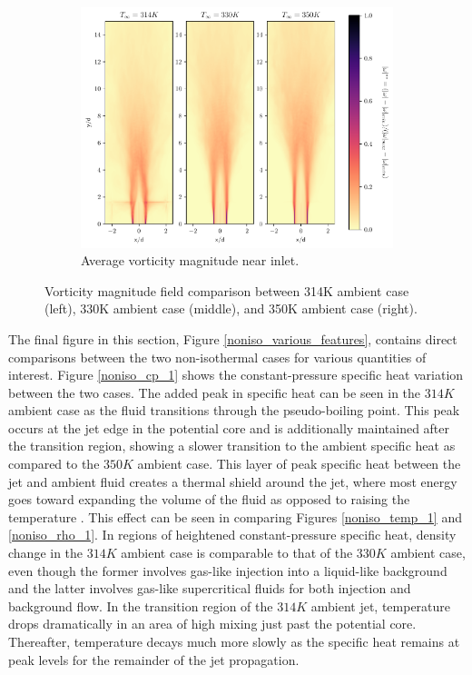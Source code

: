\begin{figure}[H]
\vfill
\centering
\begin{subfigure}{0.5\textwidth}
	\includegraphics[scale=.45]{figures/Plots/vertical/magvort_scaled_vert_avg_all_zoom.pdf}
	\caption{Average vorticity magnitude near inlet.} \label{all_magvort_3}
\end{subfigure}
\caption{Vorticity magnitude field comparison between 314K ambient case (left), 330K ambient case (middle), and 350K ambient case (right).}
\label{all_magvort_features}
\end{figure}

The final figure in this section, Figure \ref{noniso_various_features}, contains direct comparisons between the two non-isothermal cases for various quantities of interest. Figure \ref{noniso_cp_1} shows the constant-pressure specific heat variation between the two cases. The added peak in specific heat can be seen in the $314 K$ ambient case as the fluid transitions through the pseudo-boiling point. This peak occurs at the jet edge in the potential core and is additionally maintained after the transition region, showing a slower transition to the ambient specific heat as compared to the $350 K $ ambient case. This layer of peak specific heat between the jet and ambient fluid creates a thermal shield around the jet, where most energy goes toward expanding the volume of the fluid as opposed to raising the temperature \cite{10.1063/1.5054797}. This effect can be seen in comparing Figures \ref{noniso_temp_1} and \ref{noniso_rho_1}. In regions of heightened constant-pressure specific heat, density change in the $314 K$ ambient case is comparable to that of the $330 K$ ambient case, even though the former involves gas-like injection into a liquid-like background and the latter involves gas-like supercritical fluids for both injection and background flow. In the transition region of the $314K$ ambient jet, temperature drops dramatically in an area of high mixing just past the potential core. Thereafter, temperature decays much more slowly as the specific heat remains at peak levels for the remainder of the jet propagation. 

